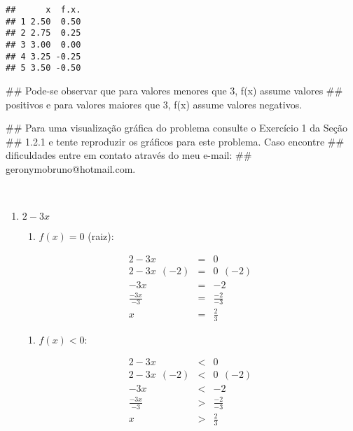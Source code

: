 \documentclass[]{book}
\newenvironment{Shaded}{\begin{snugshade}}{\end{snugshade}}
\newcommand{\NormalTok}[1]{#1}
\providecommand{\tightlist}{%
  \setlength{\itemsep}{0pt}\setlength{\parskip}{0pt}}
\begin{document}
\begin{enumerate}
\begin{verbatim}
##      x  f.x.
## 1 2.50  0.50
## 2 2.75  0.25
## 3 3.00  0.00
## 4 3.25 -0.25
## 5 3.50 -0.50
\end{verbatim}

\begin{Shaded}
\begin{Highlighting}[]
\NormalTok{##  Pode-se observar que para valores menores que 3, f(x) assume valores}
\NormalTok{## positivos e para valores maiores que 3, f(x) assume valores negativos.}

\NormalTok{##  Para uma visualização gráfica do problema consulte o Exercício 1 da Seção}
\NormalTok{## 1.2.1 e tente reproduzir os gráficos para este problema. Caso encontre}
\NormalTok{## dificuldades entre em contato através do meu e-mail:}
\NormalTok{## geronymobruno@hotmail.com.}
\end{Highlighting}
\end{Shaded}

  ~

  \begin{enumerate}
  \def\labelenumii{\alph{enumii})}
  \setcounter{enumii}{2}
  \item
    \(2-3x\)

    \begin{enumerate}
    \def\labelenumiii{\roman{enumiii})}
    \tightlist
    \item
      \(f(x) = 0\) (raiz):
    \end{enumerate}

    \begin{eqnarray}
    2-3x &=& 0 \nonumber \\
    2-3x \ \ (-2) &=& 0 \ \ (-2) \nonumber \\
    -3x &=& -2 \nonumber \\
    \frac{-3x}{-3} &=& \frac{-2}{-3} \nonumber \\
    x &=& \frac{2}{3} \nonumber
    \end{eqnarray}

    \begin{enumerate}
    \def\labelenumiii{\roman{enumiii})}
    \setcounter{enumiii}{1}
    \tightlist
    \item
      \(f(x) < 0\):
    \end{enumerate}

    \begin{eqnarray}
    2-3x &<& 0 \nonumber \\
    2-3x \ \ (-2) &<& 0 \ \ (-2) \nonumber \\
    -3x &<& -2 \nonumber \\
    \frac{-3x}{-3} &>& \frac{-2}{-3} \nonumber \\
    x &>& \frac{2}{3} \nonumber
    \end{eqnarray}


\end{enumerate}
\end{enumerate}
\end{document}
